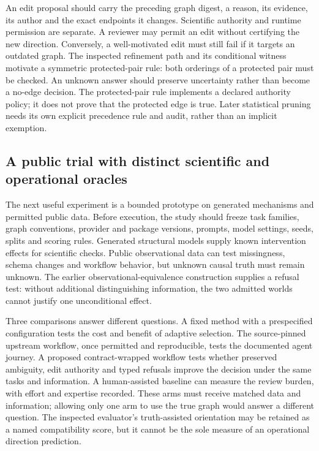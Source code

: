 An edit proposal should carry the preceding graph digest, a reason, its
evidence, its author and the exact endpoints it changes. Scientific authority
and runtime permission are separate. A reviewer may permit an edit without
certifying the new direction. Conversely, a well-motivated edit must still
fail if it targets an outdated graph. The inspected refinement path and its
conditional witness motivate a symmetric protected-pair rule: both orderings
of a protected pair must be checked. An unknown answer should preserve
uncertainty rather than become a no-edge decision. The protected-pair rule
implements a declared authority policy; it does not prove that the protected
edge is true. Later statistical pruning needs its own explicit precedence
rule and audit, rather than an implicit exemption.
\citep{exec17_copilot_code,exec17_copilot_exact,exec25_copilot_choice}

\subsection{A public trial with distinct scientific and operational oracles}

The next useful experiment is a bounded prototype on generated mechanisms
and permitted public data. Before execution, the study should freeze task
families, graph conventions, provider and package versions, prompts, model
settings, seeds, splits and scoring rules. Generated structural models supply
known intervention effects for scientific checks. Public observational data
can test missingness, schema changes and workflow behavior, but unknown
causal truth must remain unknown. The earlier observational-equivalence
construction supplies a refusal test: without additional distinguishing
information, the two admitted worlds cannot justify one unconditional effect.
\citep{exec17_copilot_exact,exec25_copilot_choice}

Three comparisons answer different questions. A fixed method with a
prespecified configuration tests the cost and benefit of adaptive selection.
The source-pinned upstream workflow, once permitted and reproducible, tests
the documented agent journey. A proposed contract-wrapped workflow tests
whether preserved ambiguity, edit authority and typed refusals improve the
decision under the same tasks and information. A human-assisted baseline
can measure the review burden, with effort and expertise recorded. These
arms must receive matched data and information; allowing only one arm to use
the true graph would answer a different question. The inspected evaluator's
truth-assisted orientation may be retained as a named compatibility score,
but it cannot be the sole measure of an operational direction prediction.
\citep{exec17_copilot_code,exec25_copilot_choice}

